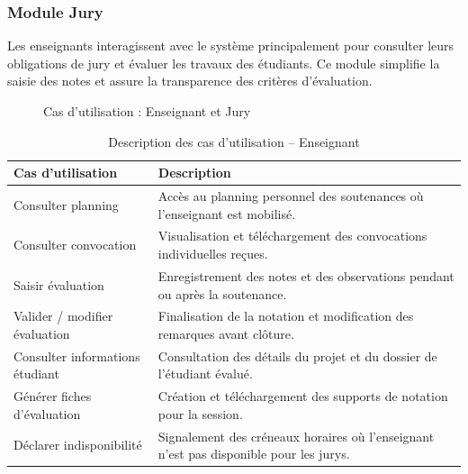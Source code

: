 \documentclass[12pt,a4paper]{article}
\begin{document}
\subsubsection{Module Jury}

Les enseignants interagissent avec le système principalement pour consulter leurs obligations de jury et évaluer les travaux des étudiants. Ce module simplifie la saisie des notes et assure la transparence des critères d'évaluation.

\begin{figure}[H]
    \centering
    \caption{Cas d'utilisation : Enseignant et Jury}
\end{figure}

\begin{table}[H]
    \centering
    \small
    \begin{tabular}{lp{10cm}}
        \toprule
        \rowcolor{primary!10}
        \textbf{Cas d'utilisation}      & \textbf{Description}                                                                   \\
        \midrule
        Consulter planning              & Accès au planning personnel des soutenances où l'enseignant est mobilisé.                 \\
        \addlinespace
        Consulter convocation           & Visualisation et téléchargement des convocations individuelles reçues.                 \\
        \addlinespace
        Saisir évaluation               & Enregistrement des notes et des observations pendant ou après la soutenance.           \\
        \addlinespace
        Valider / modifier évaluation   & Finalisation de la notation et modification des remarques avant clôture.               \\
        \addlinespace
        Consulter informations étudiant & Consultation des détails du projet et du dossier de l'étudiant évalué.                 \\
        \addlinespace
        Générer fiches d'évaluation     & Création et téléchargement des supports de notation pour la session.                   \\
        \addlinespace
        Déclarer indisponibilité        & Signalement des créneaux horaires où l'enseignant n'est pas disponible pour les jurys. \\
        \bottomrule
    \end{tabular}
    \caption{Description des cas d'utilisation -- Enseignant}
\end{table}
\end{document}
